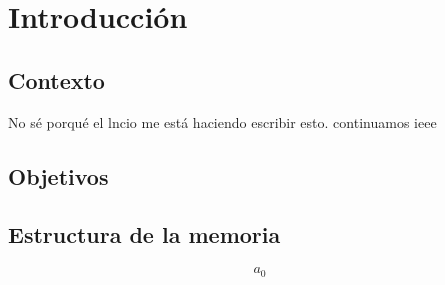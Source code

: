 
\chapter{Introducción}
\label{cap:introduccion}

\section{Contexto}
\par No sé porqué el lncio me está haciendo escribir esto. continuamos \cite{Juanma2019} \gls{ieee}
\\
\section{Objetivos}

\section{Estructura de la memoria}
\begin{equation}
	a_{0}
	\label{eq:max}
\end{equation}


